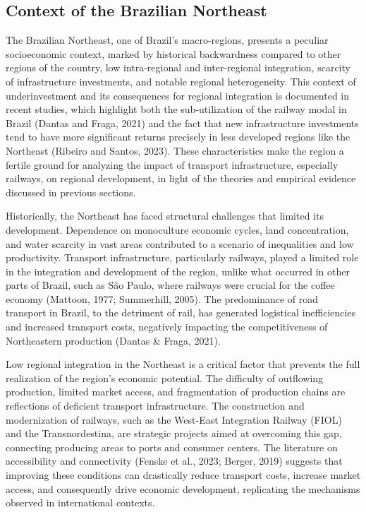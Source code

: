 \documentclass[12pt, a4paper]{article}
\begin{document}
\subsection{Context of the Brazilian Northeast}
The Brazilian Northeast, one of Brazil's macro-regions, presents a peculiar socioeconomic context, marked by historical backwardness compared to other regions of the country, low intra-regional and inter-regional integration, scarcity of infrastructure investments, and notable regional heterogeneity. This context of underinvestment and its consequences for regional integration is documented in recent studies, which highlight both the sub-utilization of the railway modal in Brazil (Dantas and Fraga, 2021) and the fact that new infrastructure investments tend to have more significant returns precisely in less developed regions like the Northeast (Ribeiro and Santos, 2023). These characteristics make the region a fertile ground for analyzing the impact of transport infrastructure, especially railways, on regional development, in light of the theories and empirical evidence discussed in previous sections. 

Historically, the Northeast has faced structural challenges that limited its development. Dependence on monoculture economic cycles, land concentration, and water scarcity in vast areas contributed to a scenario of inequalities and low productivity. Transport infrastructure, particularly railways, played a limited role in the integration and development of the region, unlike what occurred in other parts of Brazil, such as São Paulo, where railways were crucial for the coffee economy (Mattoon, 1977; Summerhill, 2005). The predominance of road transport in Brazil, to the detriment of rail, has generated logistical inefficiencies and increased transport costs, negatively impacting the competitiveness of Northeastern production (Dantas \& Fraga, 2021). 

Low regional integration in the Northeast is a critical factor that prevents the full realization of the region's economic potential. The difficulty of outflowing production, limited market access, and fragmentation of production chains are reflections of deficient transport infrastructure. The construction and modernization of railways, such as the West-East Integration Railway (FIOL) and the Transnordestina, are strategic projects aimed at overcoming this gap, connecting producing areas to ports and consumer centers. The literature on accessibility and connectivity (Fenske et al., 2023; Berger, 2019) suggests that improving these conditions can drastically reduce transport costs, increase market access, and consequently drive economic development, replicating the mechanisms observed in international contexts. 
\end{document}
